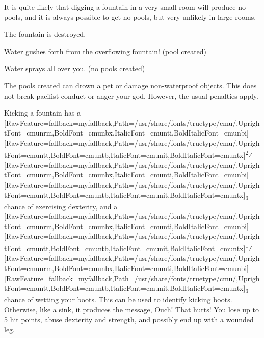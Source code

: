 It is quite likely that digging a fountain in a very small room will produce no pools, and it is always possible to get no pools, but very unlikely in large rooms.


The fountain is destroyed.




\begin{myitemize}\item{}Water gushes forth from the overflowing fountain! (pool created)
\item{}Water sprays all over you. (no pools created)
\end{myitemize}

The pools created can drown a pet or damage non-{}waterproof objects. This does not break pacifist\footnotemark[75] conduct or anger\footnotemark[76] your god\footnotemark[77]. However, the usual penalties\footnotemark[78] apply.


Kicking a fountain has a \allowbreak{}\setmainfont{cmunrm.ttf}[RawFeature={fallback=myfallback},Path=/usr/share/fonts/truetype/cmu/,UprightFont=cmunrm,BoldFont=cmunbx,ItalicFont=cmunti,BoldItalicFont=cmunbi]\setmonofont{cmunrm.ttf}[RawFeature={fallback=myfallback},Path=/usr/share/fonts/truetype/cmu/,UprightFont=cmuntt,BoldFont=cmuntb,ItalicFont=cmunit,BoldItalicFont=cmuntx]\textsuperscript{2}⁄\allowbreak{}\setmainfont{cmunrm.ttf}[RawFeature={fallback=myfallback},Path=/usr/share/fonts/truetype/cmu/,UprightFont=cmunrm,BoldFont=cmunbx,ItalicFont=cmunti,BoldItalicFont=cmunbi]\setmonofont{cmunrm.ttf}[RawFeature={fallback=myfallback},Path=/usr/share/fonts/truetype/cmu/,UprightFont=cmuntt,BoldFont=cmuntb,ItalicFont=cmunit,BoldItalicFont=cmuntx]\textsubscript{3} chance of exercising dexterity, and a \allowbreak{}\setmainfont{cmunrm.ttf}[RawFeature={fallback=myfallback},Path=/usr/share/fonts/truetype/cmu/,UprightFont=cmunrm,BoldFont=cmunbx,ItalicFont=cmunti,BoldItalicFont=cmunbi]\setmonofont{cmunrm.ttf}[RawFeature={fallback=myfallback},Path=/usr/share/fonts/truetype/cmu/,UprightFont=cmuntt,BoldFont=cmuntb,ItalicFont=cmunit,BoldItalicFont=cmuntx]\textsuperscript{1}⁄\allowbreak{}\setmainfont{cmunrm.ttf}[RawFeature={fallback=myfallback},Path=/usr/share/fonts/truetype/cmu/,UprightFont=cmunrm,BoldFont=cmunbx,ItalicFont=cmunti,BoldItalicFont=cmunbi]\setmonofont{cmunrm.ttf}[RawFeature={fallback=myfallback},Path=/usr/share/fonts/truetype/cmu/,UprightFont=cmuntt,BoldFont=cmuntb,ItalicFont=cmunit,BoldItalicFont=cmuntx]\textsubscript{3} chance of wetting\footnotemark[79] your boots. This can be used to identify kicking boots\footnotemark[80]. Otherwise, like a sink\footnotemark[81], it produces the message, Ouch! That hurts! You lose up to 5 hit points, abuse dexterity and strength, and possibly end up with a wounded leg\footnotemark[82].


